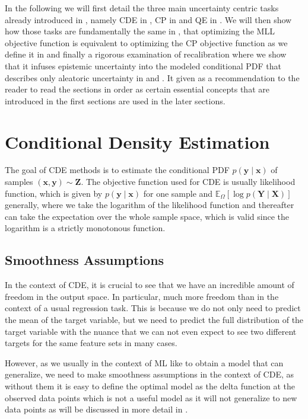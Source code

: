 In the following we will first detail the three main uncertainty centric tasks already introduced in , namely CDE in , CP in  and QE in . We will then show how those tasks are fundamentally the same in , that optimizing the MLL objective function is equivalent to optimizing the CP objective function as we define it in  and finally a rigorous examination of recalibration where we show that it infuses epistemic uncertainty into the modeled conditional PDF that describes only aleatoric uncertainty in  and . It given as a recommendation to the reader to read the sections in order as certain essential concepts that are introduced in the first sections are used in the later sections.

\section{Conditional Density Estimation}\label{sec:cde}

The goal of CDE methods is to estimate the conditional PDF $p(\mathbf{y}\mid \mathbf{x})$ of samples $(\mathbf{x}, \mathbf{y}) \sim \mathbf{Z}$. The objective function used for CDE is usually likelihood function, which is given by $p(\mathbf{y}\mid \mathbf{x})$ for one sample and $\mathbb{E}_{\Omega}\left[\log p(\mathbf{Y} \mid \mathbf{X})\right]$ generally, where we take the logarithm of the likelihood function and thereafter can take the expectation over the whole sample space, which is valid since the logarithm is a strictly monotonous function.

\subsection{Smoothness Assumptions}\label{sec:smoothness}
In the context of CDE, it is crucial to see that we have an incredible amount of freedom in the output space. In particular, much more freedom than in the context of a usual regression task. This is because we do not only need to predict the mean of the target variable, but we need to predict the full distribution of the target variable with the nuance that we can not even expect to see two different targets for the same feature sets in many cases.

However, as we usually in the context of ML like to obtain a model that can generalize, we need to make smoothness assumptions in the context of CDE, as without them it is easy to define the optimal model as the delta function at the observed data points which is not a useful model as it will not generalize to new data points as will be discussed in more detail in .

